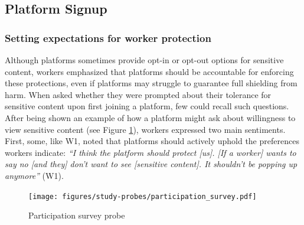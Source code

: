 

\subsection{Platform Signup}
\subsubsection{Setting expectations for worker protection}
Although platforms sometimes provide opt-in or opt-out options for sensitive content, workers emphasized that platforms should be accountable for enforcing these protections, even if platforms may struggle to guarantee full shielding from harm. When asked whether they were prompted about their tolerance for sensitive content upon first joining a platform, few could recall such questions. After being shown an example of how a platform might ask about willingness to view sensitive content (see Figure \ref{fig:participation-survey}), workers expressed two main sentiments. First, some, like W1, noted that platforms should actively uphold the preferences workers indicate: \textit{``I think the platform should protect [us]. [If a worker] wants to say no [and they] don't want to see [sensitive content]. It shouldn't be popping up anymore''} (W1). 

\begin{figure}[htbp]
    \centering
    \texttt{[image: figures/study-probes/participation\_survey.pdf]}     
    \caption{Participation survey probe}
    \label{fig:participation-survey} 
\end{figure}

